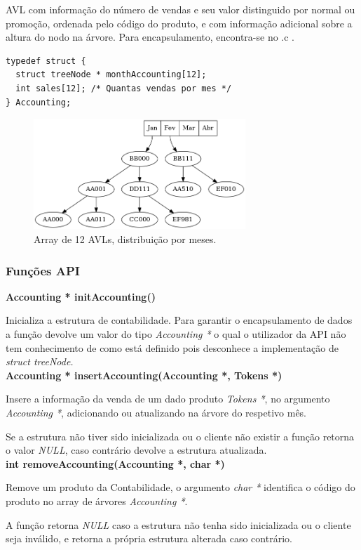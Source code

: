 \documentclass[10pt] {article}
\begin{document}
\par AVL com informação do número de vendas e seu valor distinguido por normal ou promoção, ordenada pelo código do produto, e com informação adicional sobre a altura do nodo na árvore. Para encapsulamento, encontra-se no .c .

\begin{lstlisting}
typedef struct {
  struct treeNode * monthAccounting[12];
  int sales[12]; /* Quantas vendas por mes */
} Accounting;
\end{lstlisting}
\begin{figure}[ht!]
\centering
\includegraphics[width=80mm]{accounting.png}
\caption{Array de 12 AVLs, distribuição por meses.}
\end{figure}

\subsubsection{Funções API}
\noindent \textbf {Accounting * initAccounting()}
\par Inicializa a estrutura de contabilidade.  Para garantir o encapsulamento de dados a função devolve um valor do tipo \emph{Accounting *} o qual o utilizador da API
não tem conhecimento de como está definido pois desconhece a implementação de \emph{struct treeNode.} \\

\noindent \textbf {Accounting * insertAccounting(Accounting *, Tokens *)}
\par Insere a informação da venda de um dado produto \emph{Tokens *}, no argumento \emph{Accounting *}, adicionando ou atualizando na árvore do respetivo mês.
\par Se a estrutura não tiver sido inicializada ou o cliente não existir a função retorna o valor \emph{NULL},
caso contrário devolve a estrutura atualizada. \\

\noindent \textbf {int removeAccounting(Accounting *, char *)}
\par Remove um produto da Contabilidade, o argumento \emph{char *} identifica o código do produto no array de árvores \emph{Accounting *}.
\par A função retorna \emph{NULL} caso a estrutura não tenha sido inicializada ou o cliente seja inválido, e retorna a própria estrutura alterada caso contrário. \\
\end{document}
